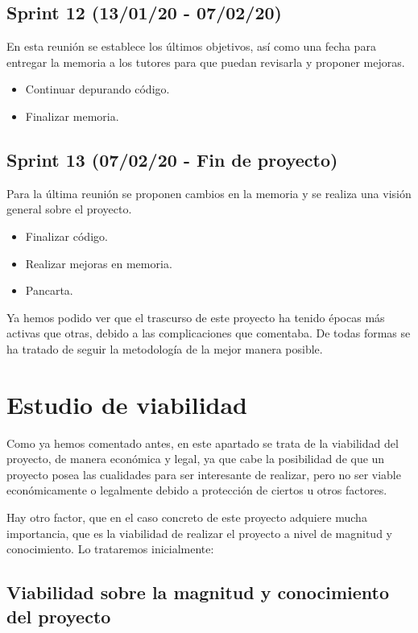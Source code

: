 \subsection{Sprint 12 (13/01/20 - 07/02/20)}

En esta reunión se establece los últimos objetivos, así como una fecha para entregar la memoria a los tutores para que puedan revisarla y proponer mejoras.

\begin{itemize}
\item Continuar depurando código.
\item Finalizar memoria.
\end{itemize}

\subsection{Sprint 13 (07/02/20 - Fin de proyecto)}

Para la última reunión se proponen cambios en la memoria y se realiza una visión general sobre el proyecto.

\begin{itemize}
\item Finalizar código.
\item Realizar mejoras en memoria.
\item Pancarta.
\end{itemize}


Ya hemos podido ver que el trascurso de este proyecto ha tenido épocas más activas que otras, debido a las complicaciones que comentaba. De todas formas se ha tratado de seguir la metodología de la mejor manera posible.

\section{Estudio de viabilidad}

Como ya hemos comentado antes, en este apartado se trata de la viabilidad del proyecto, de manera económica y legal, ya que cabe la posibilidad de que un proyecto posea las cualidades para ser interesante de realizar, pero no ser viable económicamente o legalmente debido a protección de ciertos u otros factores.

Hay otro factor, que en el caso concreto de este proyecto adquiere mucha importancia, que es la viabilidad de realizar el proyecto a nivel de magnitud y conocimiento. Lo trataremos inicialmente:

\subsection{Viabilidad sobre la magnitud y conocimiento del proyecto}


